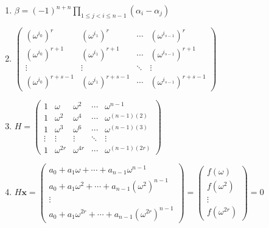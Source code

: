\documentclass[oneside,10pt,]{article}
\newcommand{\lt}{<}
\begin{document}
\begin{enumerate}
\item{}\(\beta = (-1)^{n+n} \prod_{1 \leq j \lt i \leq n - 1} (\alpha_i - \alpha_j)\)%
\item{}\(\begin{pmatrix} (\omega^{i_0})^r & (\omega^{i_1})^r & \cdots & (\omega^{i_{s-1}})^r \\ (\omega^{i_0})^{r+1} & (\omega^{i_1})^{r+1} & \cdots & (\omega^{i_{s-1}})^{r+1} \\ \vdots & \vdots & \ddots & \vdots \\ (\omega^{i_0})^{r+s-1} & (\omega^{i_1})^{r+s-1} & \cdots & (\omega^{i_{s-1}})^{r+s-1} \end{pmatrix}\)%
\item{}\(H = \begin{pmatrix} 1 & \omega & \omega^2 & \cdots & \omega^{n-1}\\ 1 & \omega^2 & \omega^{4} & \cdots & \omega^{(n-1)(2)} \\ 1 & \omega^3 & \omega^{6} & \cdots & \omega^{(n-1)(3)} \\ \vdots & \vdots & \vdots & \ddots & \vdots \\ 1 & \omega^{2r} & \omega^{4r} & \cdots & \omega^{(n-1)(2r)} \end{pmatrix}\)%
\item{}\(H {\mathbf x} = \begin{pmatrix} a_0 + a_1 \omega + \cdots + a_{n-1} \omega^{n-1} \\ a_0 + a_1 \omega^2 + \cdots + a_{n-1} (\omega^2)^{n-1} \\ \vdots \\ a_0 + a_1 \omega^{2r} + \cdots + a_{n-1} (\omega^{2r})^{n-1} \end{pmatrix} = \begin{pmatrix} f(\omega) \\ f(\omega^2) \\ \vdots \\ f(\omega^{2r}) \end{pmatrix} = 0\)%
\end{enumerate}
%
\end{document}
